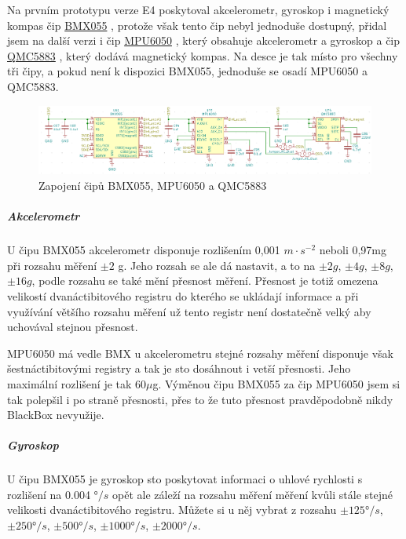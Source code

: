 Na prvním prototypu verze E4 poskytoval akcelerometr, gyroskop i magnetický kompas čip \href{https://datasheet.lcsc.com/szlcsc/Bosch-Sensortec-BMX055_C94022.pdf}{BMX055} \parencite{bmx055},
protože však tento čip nebyl jednoduše dostupný, přidal jsem na další verzi i čip \href{https://datasheet.lcsc.com/szlcsc/TDK-InvenSense-MPU-6050_C24112.pdf}{MPU6050} \parencite{mpu6050},
který obsahuje akcelerometr a gyroskop a čip \href{https://datasheet.lcsc.com/szlcsc/QST-QMC5883L-TR_C192585.pdf}{QMC5883} \parencite{qmc5883}, který dodává magnetický kompas.
Na desce je tak místo pro všechny tři čipy, a pokud není k dispozici BMX055, jednoduše se osadí MPU6050 a QMC5883. 

\begin{figure}[h]
    \centering
    \includegraphics[width=\textwidth]{kapitoly/obrazky/E4/vnimani/BMX-MPU-QMC.png}
    \caption{Zapojení čipů BMX055, MPU6050 a QMC5883}
    \label{fig:E4-9axis}
\end{figure}

\vspace{-5mm}

\subparagraph*{Akcelerometr}
U čipu BMX055 akcelerometr disponuje rozlišením 0,001 $m \cdot s^{-2}$ neboli 0,97mg při rozsahu měření $\pm2$ g. Jeho rozsah se ale dá nastavit, a to na $\pm2g$, $\pm4g$, $\pm8g$, $\pm16g$, 
podle rozsahu se také mění přesnost měření. Přesnost je totiž omezena velikostí dvanáctibitového registru do kterého se ukládají informace a při využívání většího 
rozsahu měření už tento registr není dostatečně velký aby uchovával stejnou přesnost.

MPU6050 má vedle BMX u akcelerometru stejné rozsahy měření disponuje však šestnáctibitovými registry a tak je sto dosáhnout i vetší přesnosti. Jeho maximální rozlišení je 
tak 60$\mu$g. Výměnou čipu BMX055 za čip MPU6050 jsem si tak polepšil i po straně přesnosti, přes to že tuto přesnost pravděpodobně nikdy BlackBox nevyužije. %

\subparagraph*{Gyroskop}
U čipu BMX055 je gyroskop sto poskytovat informaci o uhlové rychlosti s rozlišení na 0.004 $°/s$ opět ale záleží na rozsahu měření měření kvůli stále stejné velikosti 
dvanáctibitového registru. Můžete si u něj vybrat z rozsahu $\pm125°/s$, $\pm250°/s$, $\pm500°/s$, $\pm1 000°/s$, $\pm2 000°/s$.

